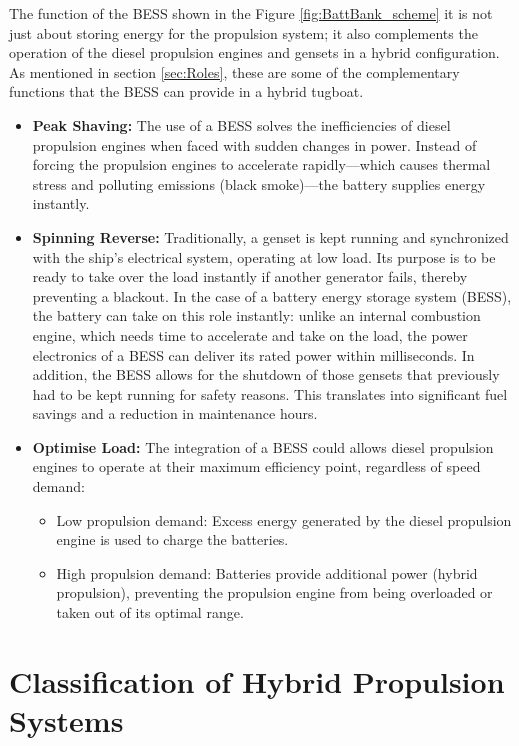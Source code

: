 The function of the BESS shown in the Figure \ref{fig:BattBank_scheme} it is not just about storing energy for the propulsion system; it also complements the operation of the diesel propulsion engines and gensets in a hybrid configuration. As mentioned in section \ref{sec:Roles}, these are some of the complementary functions that the BESS can provide in a hybrid tugboat.

\begin{itemize}
	\item \textbf{Peak Shaving:} The use of a BESS solves the inefficiencies of diesel propulsion engines when faced with sudden changes in power. Instead of forcing the propulsion engines to accelerate rapidly—which causes thermal stress and polluting emissions (black smoke)—the battery supplies energy instantly. 
	\item \textbf{Spinning Reverse:} Traditionally, a genset is kept running and synchronized with the ship’s electrical system, operating at low load. Its purpose is to be ready to take over the load instantly if another generator fails, thereby preventing a blackout.
In the case of a battery energy storage system (BESS), the battery can take on this role instantly: unlike an internal combustion engine, which needs time to accelerate and take on the load, the power electronics of a BESS can deliver its rated power within milliseconds. In addition, the BESS allows for the shutdown of those gensets that previously had to be kept running for safety reasons. This translates into significant fuel savings and a reduction in maintenance hours.
	\item \textbf{Optimise Load:} The integration of a BESS could allows diesel propulsion engines to operate at their maximum efficiency point, regardless of speed demand:
	\begin{itemize}
		\item Low propulsion demand: Excess energy generated by the diesel propulsion engine is used to charge the batteries.
		\item High propulsion demand: Batteries provide additional power (hybrid propulsion), preventing the propulsion engine from being overloaded or taken out of its optimal range.
	\end{itemize}
	
\end{itemize}

\section{Classification of Hybrid Propulsion Systems}

